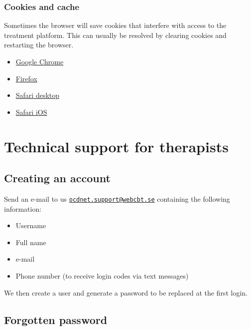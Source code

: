 \documentclass[]{book}
\providecommand{\tightlist}{%
  \setlength{\itemsep}{0pt}\setlength{\parskip}{0pt}}
\theoremstyle{definition}
\theoremstyle{definition}
\theoremstyle{definition}
\theoremstyle{remark}
\begin{document}
\hypertarget{cookies-and-cache}{%
\subsubsection{Cookies and cache}\label{cookies-and-cache}}

Sometimes the browser will save cookies that interfere with access to
the treatment platform. This can usually be resolved by clearing cookies
and restarting the browser.

\begin{itemize}
\tightlist
\item
  \href{https://support.google.com/chrome/answer/95647?co=GENIE.Platform\%3DDesktop\&hl=en}{Google
  Chrome}
\item
  \href{https://support.mozilla.org/en-US/kb/delete-cookies-remove-info-websites-stored}{Firefox}
\item
  \href{https://support.apple.com/kb/ph21411?locale=en_US}{Safari
  desktop}
\item
  \href{https://support.apple.com/en-gb/HT201265}{Safari iOS}
\end{itemize}

\hypertarget{technical-support-for-therapists}{%
\section{Technical support for
therapists}\label{technical-support-for-therapists}}

\hypertarget{creating-an-account}{%
\subsection{Creating an account}\label{creating-an-account}}

Send an e-mail to us
\href{mailto:ocdnet.support@webcbt.se}{\nolinkurl{ocdnet.support@webcbt.se}}
containing the following information:

\begin{itemize}
\tightlist
\item
  Username
\item
  Full name
\item
  e-mail
\item
  Phone number (to receive login codes via text messages)
\end{itemize}

We then create a user and generate a password to be replaced at the
first login.

\hypertarget{forgotten-password}{%
\subsection{Forgotten password}\label{forgotten-password}}
\end{document}
